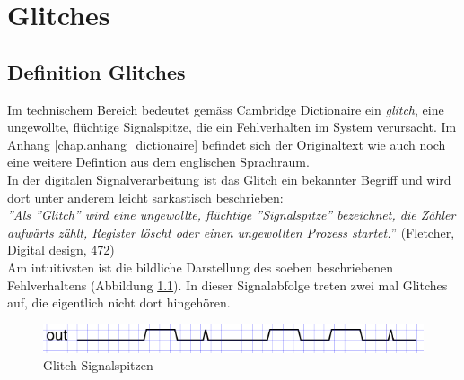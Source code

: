 
\chapter{Glitches}\label{chap.glitch}

\section{Definition Glitches}\label{sect.glitch_def}
Im technischem Bereich bedeutet gemäss Cambridge Dictionaire ein \textit{glitch}, eine ungewollte, flüchtige Signalspitze, die ein Fehlverhalten im System verursacht. Im Anhang \ref{chap.anhang_dictionaire} befindet sich der Originaltext wie auch noch eine weitere Defintion aus dem englischen Sprachraum.\\
\newline
In der digitalen Signalverarbeitung ist das Glitch ein bekannter Begriff und wird dort unter anderem leicht sarkastisch beschrieben:\\
\newline
\textit{''Als ''Glitch''  wird eine ungewollte, flüchtige ''Signalspitze'' bezeichnet, die Zähler aufwärts zählt, Register löscht oder einen ungewollten Prozess startet.}'' (Fletcher, Digital design, 472)\\
\newline
Am intuitivsten ist die bildliche Darstellung des soeben beschriebenen Fehlverhaltens (Abbildung \ref{fig.glitch.def}). In dieser Signalabfolge treten zwei mal Glitches auf, die eigentlich nicht dort hingehören.\\
\begin{figure}[H]
	\centering
	\includegraphics[width=\textwidth]{images/def_glitch_1.png}
	\caption{Glitch-Signalspitzen}
	\label{fig.glitch.def}
\end{figure}

